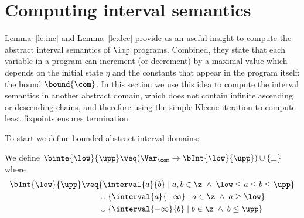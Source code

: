 \section{Computing interval semantics}\label{sec:computingint}

Lemma~\ref{le:inc} and Lemma~\ref{le:dec} provide us an useful insight
to compute the abstract interval semantics of \(\imp\)
programs. Combined, they state that each variable in a program can
increment (or decrement) by a maximal value which depends on the
initial state \(\eta\) and the constants that appear in the program
itself: the bound \(\bound{\com}\). In this section we use this idea
to compute the interval semantics in another abstract domain, which
does not contain infinite ascending or descending chains, and
therefore using the simple Kleene iteration to compute least
fixpoints ensures termination.

To start we define bounded abstract interval domains:


\begin{definition}\label{def:boundedint}
  We define
  \(\binte{\low}{\upp} \veq (\Var_{\com} \to \bInt{\low}{\upp}) \cup
  \{\bot\}\) where
  \begin{align*}
    \bInt{\low}{\upp} & \veq \{ \interval{a}{b} \mid a, b \in \z \; \land \; \low \leq a \leq b \leq \upp\} \\
                    & \phantom{\veq} \cup \{\interval{a}{+\infty} \mid a \in \z \; \land \; a \geq \low\} \\
                    & \phantom{\veq} \cup \{\interval{-\infty}{b} \mid b \in \z \; \land \; b \leq \upp\}
  \end{align*}
\end{definition}

